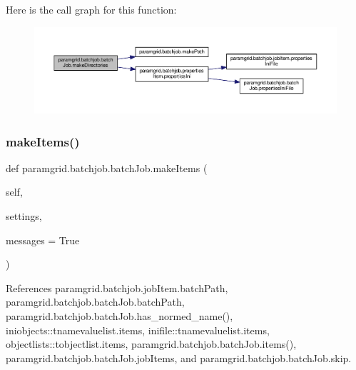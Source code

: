 Here is the call graph for this function\+:
\nopagebreak
\begin{figure}[H]
\begin{center}
\leavevmode
\includegraphics[width=350pt]{classparamgrid_1_1batchjob_1_1batchJob_a57b86d97815822c389607772822f7e93_cgraph}
\end{center}
\end{figure}
\mbox{\label{classparamgrid_1_1batchjob_1_1batchJob_a6285bac486b704b012f454c29ab88595}} 
\subsubsection{\texorpdfstring{make\+Items()}{makeItems()}}
{\footnotesize\ttfamily def paramgrid.\+batchjob.\+batch\+Job.\+make\+Items (\begin{DoxyParamCaption}\item[{}]{self,  }\item[{}]{settings,  }\item[{}]{messages = {\ttfamily True} }\end{DoxyParamCaption})}



References paramgrid.\+batchjob.\+job\+Item.\+batch\+Path, paramgrid.\+batchjob.\+batch\+Job.\+batch\+Path, paramgrid.\+batchjob.\+batch\+Job.\+has\+\_\+normed\+\_\+name(), iniobjects\+::tnamevaluelist.\+items, inifile\+::tnamevaluelist.\+items, objectlists\+::tobjectlist.\+items, paramgrid.\+batchjob.\+batch\+Job.\+items(), paramgrid.\+batchjob.\+batch\+Job.\+job\+Items, and paramgrid.\+batchjob.\+batch\+Job.\+skip.


